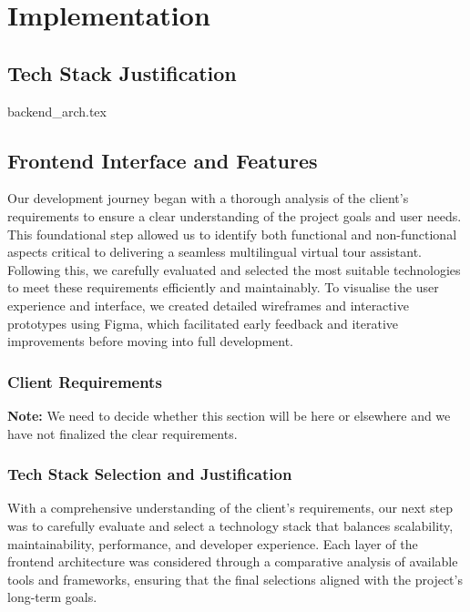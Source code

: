 \chapter{Implementation}
\section{Tech Stack Justification}
{backend_arch.tex}
\section{Frontend Interface and Features}

Our development journey began with a thorough analysis of the client’s requirements to ensure a clear understanding of the project goals and user needs. This foundational step allowed us to identify both functional and non-functional aspects critical to delivering a seamless multilingual virtual tour assistant. Following this, we carefully evaluated and selected the most suitable technologies to meet these requirements efficiently and maintainably. To visualise the user experience and interface, we created detailed wireframes and interactive prototypes using Figma, which facilitated early feedback and iterative improvements before moving into full development.

\subsection{Client Requirements}

\textbf{Note:} We need to decide whether this section will be here or elsewhere and we have not finalized the clear requirements.

\subsection{Tech Stack Selection and Justification}

With a comprehensive understanding of the client's requirements, our next step was to carefully evaluate and select a technology stack that balances scalability, maintainability, performance, and developer experience. Each layer of the frontend architecture was considered through a comparative analysis of available tools and frameworks, ensuring that the final selections aligned with the project’s long-term goals.

